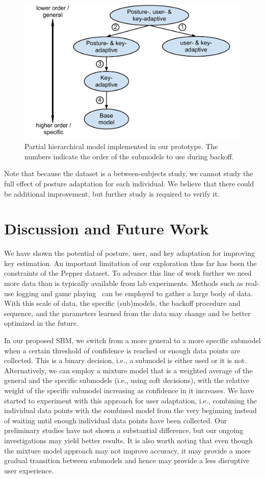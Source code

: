 \documentclass{sigchi}
\begin{document}
\begin{figure}
  \centering
  \includegraphics[width=0.9\columnwidth]{figures/partial-hierarchy.pdf}
  \caption{Partial hierarchical model implemented in our prototype. The numbers indicate the order of the 
submodels to use during backoff.}
  \label{fig:partial-hierarchy}
\end{figure}
Note that because the dataset is a between-subjects study, we cannot study
the full effect of posture adaptation for each individual. We believe that there could be additional improvement, but further study is required to verify it.
\pagebreak
\section{Discussion and Future Work}
We have shown the potential of posture, user, and key adaptation for 
improving key estimation. An important limitation of our exploration thus far has been
the constraints of the Pepper dataset. To advance this line of work further we
need more data than is typically available from lab experiments. Methods such as real-use logging and game 
playing~\cite{Rudchenko:2011} can be employed to gather a large body of
data. With this scale of data, the specific (sub)models, the
backoff procedure and sequence, and the parameters learned from the 
data may change and be better optimized in the future.

In our proposed SBM, we switch from a more general to a more specific submodel
when a certain threshold of confidence is reached or enough data points are
collected. This is a binary decision, i.e., a submodel is either used or it is not.
Alternatively,
we can employ a mixture model that is a weighted average of
the general and the specific submodels (i.e., using soft decisions), with the
relative weight of the specific submodel increasing as confidence in it increases. We have started to experiment with this approach for user adaptation,
i.e., combining the individual data points with the combined model from the very beginning instead
of waiting until enough individual data points have been collected. Our preliminary studies have not shown a substantial difference, but our ongoing investigations may yield better results.
It is also worth noting that even though the mixture model approach may not
improve accuracy, it may provide a more gradual transition between submodels
and hence may provide a less disruptive user experience. 
\end{document}
